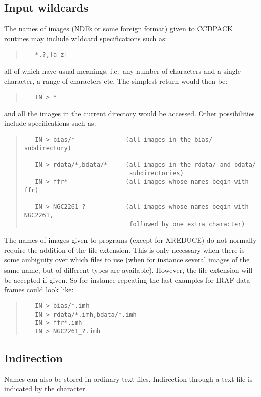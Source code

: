 \documentclass[twoside,11pt]{article}
\newcommand{\htmlref}[2]{#1}
\renewcommand{\_}{\texttt{\symbol{95}}}
\newenvironment{myquote}{\begin{quote}\begin{small}}{\end{small}\end{quote}}
\newcommand{\xroutine}[1]{\htmlref{{\sc #1}}{#1}}
\begin{document}
\subsection{Input wildcards}
The names of images (NDFs or some foreign format) given to CCDPACK
routines may include wildcard specifications such as:
\begin{myquote}
\begin{verbatim}
   *,?,[a-z]
\end{verbatim}
\end{myquote}
all of which have usual meanings, i.e.\ any number of characters and a
single character, a range of characters etc.
The simplest return would then be:
\begin{myquote}
\begin{verbatim}
   IN > *
\end{verbatim}
\end{myquote}
and all the images in the current directory would be accessed. Other
possibilities include specifications such as:
\begin{myquote}
\begin{verbatim}
   IN > bias/*              (all images in the bias/ subdirectory)

   IN > rdata/*,bdata/*     (all images in the rdata/ and bdata/
                             subdirectories)
   IN > ffr*                (all images whose names begin with ffr)

   IN > NGC2261_?           (all images whose names begin with NGC2261,
                             followed by one extra character)
\end{verbatim}
\end{myquote}

The names of images given to programs (except for \xroutine{XREDUCE})
do not normally require the addition of the file extension. This
is only necessary when there is some ambiguity over which files to
use (when for instance several images of the same name, but of
different types are available). However, the file extension will
be accepted if given. So for instance repeating the last examples
for IRAF data frames could look like:
\begin{myquote}
\begin{verbatim}
   IN > bias/*.imh
   IN > rdata/*.imh,bdata/*.imh
   IN > ffr*.imh
   IN > NGC2261_?.imh
\end{verbatim}
\end{myquote}

\subsection{Indirection}
Names can also be stored in ordinary text files. Indirection through a
text file is indicated by the character.
\end{document}

